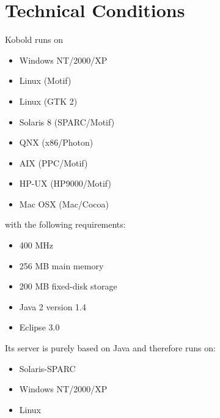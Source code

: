 \chapter{Technical Conditions}

Kobold runs on 

\begin{itemize}
\item Windows NT/2000/XP
\item Linux (Motif)
\item Linux (GTK 2)
\item Solaris 8 (SPARC/Motif)
\item QNX (x86/Photon)
\item AIX (PPC/Motif)
\item HP-UX (HP9000/Motif)
\item Mac OSX (Mac/Cocoa)
\end{itemize}

with the following requirements: \par

\begin{itemize}
\item 400 MHz
\item 256 MB main memory
\item 200 MB fixed-disk storage
\item Java 2 version 1.4
\item Eclipse 3.0
\end{itemize}
\par
\par

Its server is purely based on Java and therefore runs on:
\begin{itemize}
\item Solaris-SPARC
\item Windows NT/2000/XP
\item Linux
\end{itemize}
